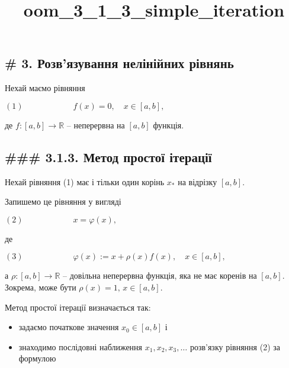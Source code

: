 \documentclass[11pt]{article}
\title{oom\_3\_1\_3\_simple\_iteration}
\begin{document}
    
    \maketitle
    
    

    
    \hypertarget{ux440ux43eux437ux432ux44fux437ux443ux432ux430ux43dux43dux44f-ux43dux435ux43bux456ux43dux456ux439ux43dux438ux445-ux440ux456ux432ux43dux44fux43dux44c}{%
\subsection{\# 3. Розв'язування нелінійних
рівнянь}\label{ux440ux43eux437ux432ux44fux437ux443ux432ux430ux43dux43dux44f-ux43dux435ux43bux456ux43dux456ux439ux43dux438ux445-ux440ux456ux432ux43dux44fux43dux44c}}

    Нехай маємо рівняння

\((1)\qquad\qquad\qquad f(x)=0, \quad x\in [a,b],\)

де \(f:[a,b]\to \mathbb{R}\) -- неперервна на \([a,b]\) функція.

    \hypertarget{ux43cux435ux442ux43eux434-ux43fux440ux43eux441ux442ux43eux457-ux456ux442ux435ux440ux430ux446ux456ux457}{%
\subsection{\#\#\# 3.1.3. Метод простої
ітерації}\label{ux43cux435ux442ux43eux434-ux43fux440ux43eux441ux442ux43eux457-ux456ux442ux435ux440ux430ux446ux456ux457}}

Нехай рівняння (1) має і тільки один корінь \(x_*\) на відрізку
\([a,b]\).

Запишемо це рівняння у вигляді

\((2)\qquad\qquad\qquad x = \varphi (x),\)

де

\((3)\qquad\qquad\qquad \varphi(x) := x + \rho(x)f(x),\quad x\in [a,b],\)

а \(\rho:[a,b]\to \mathbb{R}\) -- довільна неперервна функція, яка не
має коренів на \([a,b]\). Зокрема, може бути
\(\rho(x)= 1,\, x\in [a,b]\).

    Метод простої ітерації визначається так:

\begin{itemize}
\item
  задаємо початкове значення \(x_0\in [a,b]\) і
\item
  знаходимо послідовні наближення \(x_1, x_2, x_3, \ldots\) розв'язку
  рівняння (2) за формулою
\end{itemize}
\end{document}
